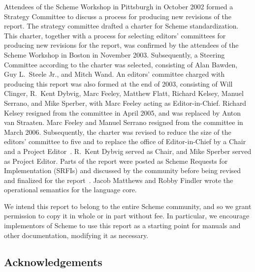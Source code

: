 Attendees of the Scheme Workshop in Pittsburgh in October 2002 formed
a Strategy Committee to discuss a process for producing new revisions
of the report.  The strategy committee drafted a charter for Scheme
standardization.  This charter, together with a process for selecting
editors' committees for producing new revisions for the report, was
confirmed by the attendees of the Scheme Workshop in Boston in
November 2003.  Subsequently, a Steering Committee according to the
charter was selected, consisting of Alan Bawden, Guy L.\ Steele Jr.,
and Mitch Wand.  An editors' committee charged with producing this report was
also formed at the end of 2003, consisting of Will Clinger,
R.\ Kent Dybvig, Marc Feeley, Matthew Flatt, Richard Kelsey, Manuel
Serrano, and Mike Sperber, with Marc Feeley acting as Editor-in-Chief.
Richard Kelsey resigned from the committee in April 2005, and was
replaced by Anton van Straaten.  
Marc Feeley and Manuel Serrano
resigned from the committee in March 2006.  Subsequently, the charter
was revised to reduce the size of the editors' committee to five and
to replace the office of Editor-in-Chief by a Chair and a Project
Editor~\cite{SchemeCharter2006}.  R.\ Kent Dybvig served as Chair, and
Mike Sperber served as Project Editor.
Parts of the report were posted as Scheme Requests for Implementation
(SRFIs) and discussed by the community before being revised and finalized for
the report~\cite{srfi75,srfi76,srfi77,srfi83,srfi93}.
Jacob Matthews and Robby
Findler wrote the operational semantics for the language core.

\medskip

We intend this report to belong to the entire Scheme community, and so
we grant permission to copy it in whole or in part without fee.  In
particular, we encourage implementors of Scheme to use this report as
a starting point for manuals and other documentation, modifying it as
necessary.




\subsection*{Acknowledgements}

